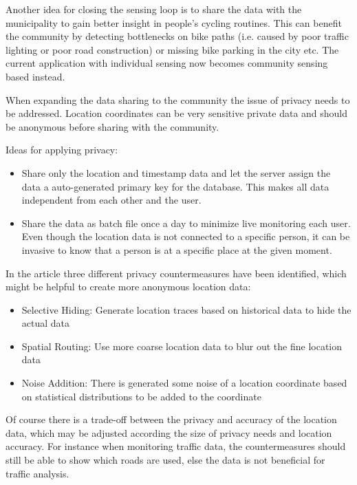 Another idea for closing the sensing loop is to share the data with the municipality to gain better insight in people's cycling routines. This can benefit the community by detecting bottlenecks on bike paths (i.e. caused by poor traffic lighting or poor road construction) or missing bike parking in the city etc. 
The current application with individual sensing now becomes community sensing based instead.

When expanding the data sharing to the community the issue of privacy needs to be addressed. Location coordinates can be very sensitive private data and should be anonymous before sharing with the community.  

Ideas for applying privacy:
\begin{itemize}
    \item Share only the location and timestamp data and let the server assign the data a auto-generated primary key for the database. This makes all data independent from each other and the user.
    \item Share the data as batch file once a day to minimize live monitoring each user. Even though the location data is not connected to a specific person, it can be invasive to know that a person is at a specific place at the given moment.
\end{itemize}

In the article \cite{Mun2009} three different privacy countermeasures have been identified, which might be helpful to create more anonymous location data:
\begin{itemize}
    \item Selective Hiding: Generate location traces based on historical data to hide the actual data
    \item Spatial Routing: Use more coarse location data to blur out the fine location data
    \item Noise Addition: There is generated some noise of a location coordinate based on statistical distributions to be added to the coordinate
\end{itemize}

Of course there is a trade-off between the privacy and accuracy of the location data, which may be adjusted according the size of privacy needs and location accuracy. For instance when monitoring traffic data, the countermeasures should still be able to show which roads are used, else the data is not beneficial for traffic analysis.
